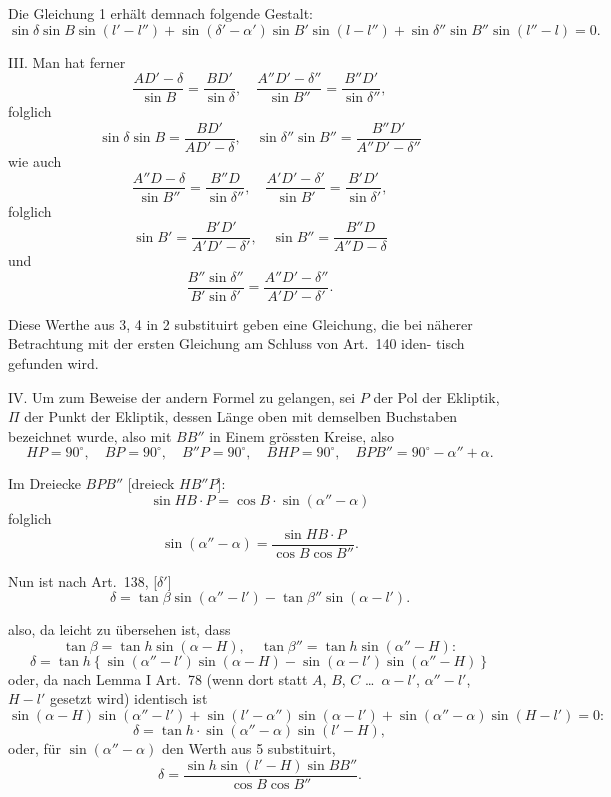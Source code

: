 \documentclass[12pt,a4paper]{article}
\begin{document}
\newpage

Die Gleichung 1 erh\"alt demnach folgende Gestalt:
\begin{equation}\tag{2}
\sin\delta\sin B\sin(l' - l'') + \sin(\delta' - \alpha')\sin B'\sin(l - l'') + \sin\delta''\sin B''\sin(l'' - l) = 0.
\end{equation}

III. Man hat ferner
\[
\frac{AD' - \delta}{\sin B} = \frac{BD'}{\sin\delta}, \quad \frac{A''D' - \delta''}{\sin B''} = \frac{B''D'}{\sin\delta''},
\]
folglich
\begin{equation}\tag{3}
\sin\delta\sin B = \frac{BD'}{AD' - \delta}, \quad \sin\delta''\sin B'' = \frac{B''D'}{A''D' - \delta''}
\end{equation}
wie auch
\[
\frac{A''D - \delta}{\sin B''} = \frac{B''D}{\sin\delta''}, \quad \frac{A'D' - \delta'}{\sin B'} = \frac{B'D'}{\sin\delta'},
\]
folglich
\begin{equation}\tag{4}
\sin B' = \frac{B'D'}{A'D' - \delta'}, \quad \sin B'' = \frac{B''D}{A''D - \delta}
\end{equation}
und
\[
\frac{B''\sin\delta''}{B'\sin\delta'} = \frac{A''D' - \delta''}{A'D' - \delta'}.
\]

Diese Werthe aus 3, 4 in 2 substituirt geben eine Gleichung, die bei
n\"aherer Betrachtung mit der ersten Gleichung am Schluss von Art.~140 iden-
tisch gefunden wird.

IV. Um zum Beweise der andern Formel zu gelangen, sei $P$ der Pol
der Ekliptik, $\Pi$ der Punkt der Ekliptik, dessen L\"ange oben mit demselben
Buchstaben bezeichnet wurde, also mit $BB''$ in Einem gr\"ossten Kreise,
also
\[
HP = 90^\circ, \quad BP = 90^\circ, \quad B''P = 90^\circ, \quad BHP = 90^\circ, \quad BPB'' = 90^\circ - \alpha'' + \alpha.
\]

Im Dreiecke $BPB''$ [dreieck $HB''P$]:
\[
\sin HB \cdot P = \cos B \cdot \sin(\alpha'' - \alpha)
\]
folglich
\begin{equation}\tag{5}
\sin(\alpha'' - \alpha) = \frac{\sin HB \cdot P}{\cos B \cos B''}.
\end{equation}

Nun ist nach Art.~138, [$\delta'$]
\[
\delta = \tan\beta \sin(\alpha'' - l') - \tan\beta''\sin(\alpha - l').
\]

\newpage

also, da leicht zu \"ubersehen ist, dass
\[
\tan\beta = \tan h \sin(\alpha - H), \quad \tan\beta'' = \tan h \sin(\alpha'' - H):
\]
\[
\delta = \tan h \left\{\sin(\alpha'' - l')\sin(\alpha - H) - \sin(\alpha - l')\sin(\alpha'' - H)\right\}
\]
oder, da nach Lemma I Art.~78 (wenn dort statt $A$, $B$, $C$ \ldots\ $\alpha - l'$, $\alpha'' - l'$,
$H - l'$ gesetzt wird) identisch ist
\[
\sin(\alpha - H)\sin(\alpha'' - l') + \sin(l' - \alpha'')\sin(\alpha - l') + \sin(\alpha'' - \alpha)\sin(H - l') = 0:
\]
\[
\delta = \tan h \cdot \sin(\alpha'' - \alpha)\sin(l' - H),
\]
oder, f\"ur $\sin(\alpha'' - \alpha)$ den Werth aus 5 substituirt,
\[
\delta = \frac{\sin h \sin(l' - H) \sin BB''}{\cos B \cos B''}.
\]
\end{document}
